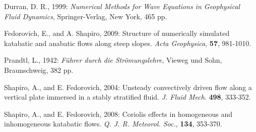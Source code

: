 \documentclass[gmd]{copernicus}
\begin{document}
\noindent Durran, D. R., 1999: \textit{Numerical Methods for Wave Equations in Geophysical Fluid Dynamics}, Springer-Verlag, New York, 465 pp.

\smallskip

\noindent Fedorovich, E., and A. Shapiro, 2009: Structure of numerically simulated katabatic and anabatic flows along steep slopes. \textit{Acta Geophysica},  \textbf{57}, 981-1010.

\smallskip

\noindent Prandtl, L., 1942: \textit{F\"{u}hrer durch die Str\"{o}mungslehre}, Vieweg und Sohn, Braunschweig, 382 pp.

\smallskip

\noindent Shapiro, A., and E. Fedorovich, 2004: Unsteady convectively driven flow along a vertical plate immersed in a stably stratified fluid. \textit{J. Fluid Mech}. \textbf{498}, 333-352.

\smallskip

\noindent Shapiro, A., and E. Fedorovich, 2008: Coriolis effects in homogeneous and inhomogeneous katabatic flows. \textit{Q. J. R. Meteorol. Soc.}, \textbf{134}, 353-370.
\end{document}
